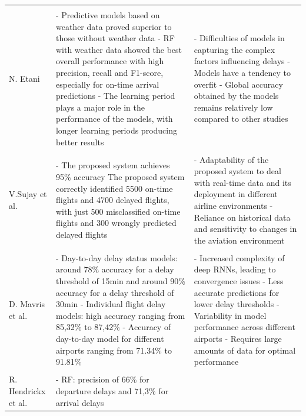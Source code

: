 \documentclass[12pt,oneside]{book} %
\begin{document}
\begin{longtable}{>{\raggedright\arraybackslash}p{2.5cm} p{7.3cm} >{\raggedright\arraybackslash}p{7.3cm}}
& & 
\\
N. Etani \cite{Etani}
& - Predictive models based on weather data proved superior to those without weather data
\newline - RF with weather data showed the best overall performance with high precision, recall and F1-score, especially for on-time arrival predictions
\newline - The learning period plays a major role in the performance of the models, with longer learning periods producing better results
& - Difficulties of models in capturing the complex factors influencing delays
\newline - Models have a tendency to overfit
\newline - Global accuracy obtained by the models remains relatively low compared to other studies
\\
& & 
\\
V.Sujay et al. \cite{Sujay}
& - The proposed system achieves 95\% accuracy
\newline  The proposed system correctly identified 5500 on-time flights and 4700 delayed flights, with just 500 misclassified on-time flights and 300 wrongly predicted delayed flights
& - Adaptability of the proposed system to deal with real-time data and its deployment in different airline environments
\newline - Reliance on historical data and sensitivity to changes in the aviation environment
\\
& & 
\\
D. Mavris et al. \cite{Mavris}
& - Day-to-day delay status models: around 78\% accuracy for a delay threshold of 15min and around 90\% accuracy for a delay threshold of 30min
\newline - Individual flight delay models: high accuracy ranging from 85,32\% to 87,42\%
\newline - Accuracy of day-to-day model for different airports ranging from 71.34\% to 91.81\%
& - Increased complexity of deep RNNs, leading to convergence issues
\newline - Less accurate predictions for lower delay thresholds
\newline - Variability in model performance across different airports
\newline - Requires large amounts of data for optimal performance
\\
& & 
\\
R. Hendrickx et al. \cite{hendrickx}  
& - RF: precision of 66\% for departure delays and 71,3\% for arrival delays

\end{longtable}
\end{document}
